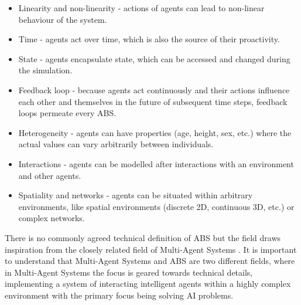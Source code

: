 \begin{itemize}
	\item Linearity and non-linearity - actions of agents can lead to non-linear behaviour of the system.
	\item Time - agents act over time, which is also the source of their proactivity.
	\item State - agents encapsulate state, which can be accessed and changed during the simulation.
	\item Feedback loop - because agents act continuously and their actions influence each other and themselves in the future of subsequent time steps, feedback loops permeate every ABS. 
	\item Heterogeneity - agents can have properties (age, height, sex, etc.) where the actual values can vary arbitrarily between individuals.
	\item Interactions - agents can be modelled after interactions with an environment and other agents.
	\item Spatiality and networks - agents can be situated within arbitrary environments, like spatial environments (discrete 2D, continuous 3D, etc.) or complex networks.
\end{itemize}

There is no commonly agreed technical definition of ABS but the field draws inspiration from the closely related field of Multi-Agent Systems \cite{weiss_multiagent_2013,wooldridge_introduction_2009}. It is important to understand that Multi-Agent Systems and ABS are two different fields, where in Multi-Agent Systems the focus is geared towards technical details, implementing a system of interacting intelligent agents within a highly complex environment with the primary focus being solving AI problems.

\medskip

